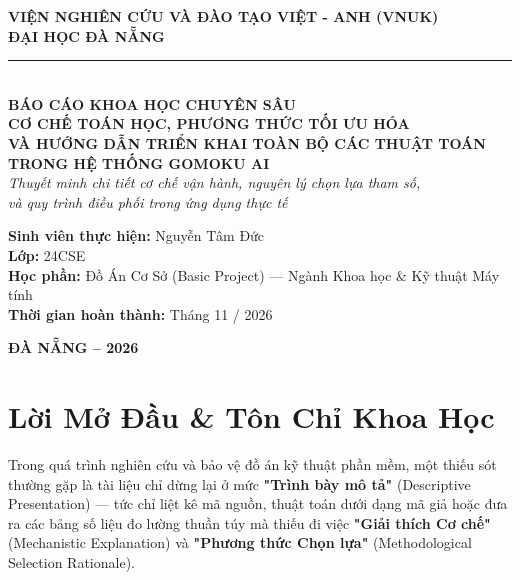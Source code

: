 \documentclass[11pt,a4paper]{report}
\begin{document}
\begin{titlepage}
\begin{center}
    {\large \textbf{VIỆN NGHIÊN CỨU VÀ ĐÀO TẠO VIỆT - ANH (VNUK)}}\\[4pt]
    {\large \textbf{ĐẠI HỌC ĐÀ NẴNG}}\\[8pt]
    \rule{0.6\textwidth}{1.2pt}\\[2.5cm]

    {\large \textbf{BÁO CÁO KHOA HỌC CHUYÊN SÂU}}\\[12pt]
    {\LARGE \bfseries \color{primary} CƠ CHẾ TOÁN HỌC, PHƯƠNG THỨC TỐI ƯU HÓA\\VÀ HƯỚNG DẪN TRIỂN KHAI TOÀN BỘ CÁC THUẬT TOÁN\\TRONG HỆ THỐNG GOMOKU AI}\\[16pt]
    {\large \textit{Thuyết minh chi tiết cơ chế vận hành, nguyên lý chọn lựa tham số,\\và quy trình điều phối trong ứng dụng thực tế}}\\[2.5cm]

    \begin{minipage}{0.8\textwidth}
        \large
        \textbf{Sinh viên thực hiện:} Nguyễn Tâm Đức\\
        \textbf{Lớp:} 24CSE\\
        \textbf{Học phần:} Đồ Án Cơ Sở (Basic Project) — Ngành Khoa học \& Kỹ thuật Máy tính\\
        \textbf{Thời gian hoàn thành:} Tháng 11 / 2026
    \end{minipage}

    \vfill
    {\large \textbf{ĐÀ NẴNG -- 2026}}
\end{center}
\end{titlepage}

\chapter*{Lời Mở Đầu \& Tôn Chỉ Khoa Học}

Trong quá trình nghiên cứu và bảo vệ đồ án kỹ thuật phần mềm, một thiếu sót thường gặp là tài liệu chỉ dừng lại ở mức \textbf{"Trình bày mô tả"} (Descriptive Presentation) --- tức chỉ liệt kê mã nguồn, thuật toán dưới dạng mã giả hoặc đưa ra các bảng số liệu đo lường thuần túy mà thiếu đi việc \textbf{"Giải thích Cơ chế"} (Mechanistic Explanation) và \textbf{"Phương thức Chọn lựa"} (Methodological Selection Rationale). 
\end{document}
